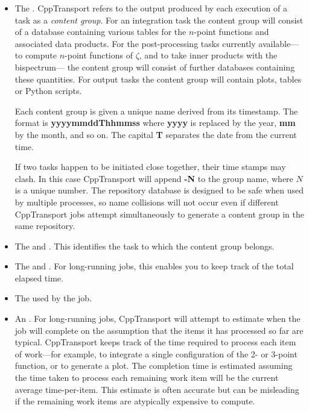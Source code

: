 \documentclass[11pt,a4paper]{article}
\newcommand{\repoobject}[1]{{\ttfamily\bfseries\small #1}}
\newcommand{\packagefont}{\sffamily}
\newcommand{\CppTransport}{{\packagefont CppTransport}}
\newcommand{\semibold}[1]{{\fontseries{b}\selectfont{#1}}}
\begin{document}
\begin{itemize}
    \item The \semibold{group name}. {\CppTransport} refers to the output produced
    by each execution of a task as a \emph{content group}.
    For an integration task the content group will consist of a database
    containing
    various tables for the $n$-point functions and associated data products.
    For the post-processing tasks currently available---%
    to compute $n$-point functions of $\zeta$, and to take inner products
    with the bispectrum---%
    the content group will consist of
    further databases containing these quantities.
    For output tasks the content group will contain plots, tables
    or Python scripts.

    Each content group is given a unique name derived from its timestamp.
    The format is \repoobject{yyyymmddThhmmss}
    where \repoobject{yyyy} is replaced by the year,
    \repoobject{mm} by the month,
    and so on.
    The capital \repoobject{T} separates the date
    from the current time.

    If two tasks happen to be initiated close together, their time stamps
    may clash. In this case {\CppTransport} will append
    \repoobject{-N} to the group name, where $N$ is a unique number.
    The repository database is designed to be safe when used
    by multiple processes, so name collisions will not occur even if
    different {\CppTransport} jobs attempt simultaneously
    to generate a content group
    in the same repository.
    
    \item The \semibold{task name} and \semibold{task type}. This identifies the task to which the content group belongs.

    \item The \semibold{job start time} and \semibold{duration}.
    For long-running jobs, this enables you to keep track of the total elapsed time.
    
    \item The \semibold{number of cores} used by the job.
    
    \item An \semibold{estimated time of completion}.
    For long-running jobs, {\CppTransport}
    will attempt to estimate when the job will complete on the assumption that the
    items it has processed so far are typical.
    {\CppTransport} keeps track of the time required to process each item of work---for
    example, to integrate a single configuration of the 2- or 3-point function,
    or to generate a plot.
    The completion time is estimated assuming the time taken
    to process each remaining
    work item will be the current average time-per-item.
    This estimate is often accurate but can be misleading if the remaining
    work items are atypically expensive to compute.
    

\end{itemize}
\end{document}
